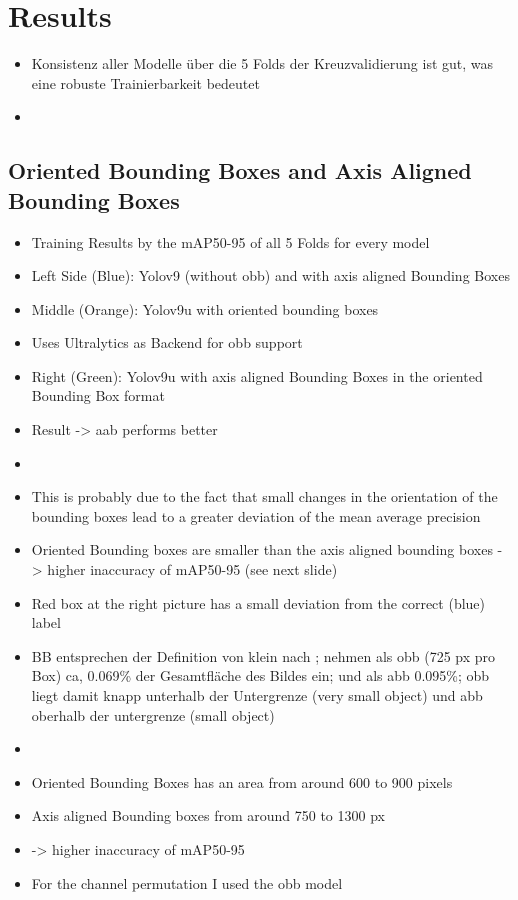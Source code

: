 \chapter{Results}
\label{ch:results}


\begin{itemize}
    \item Konsistenz aller Modelle über die 5 Folds der Kreuzvalidierung ist gut, was eine robuste Trainierbarkeit bedeutet
    \item {}
\end{itemize}
\section{Oriented Bounding Boxes and Axis Aligned Bounding Boxes}
\begin{itemize}
    \item Training Results by the mAP50-95 of all 5 Folds for every model 
    \item Left Side (Blue): Yolov9 (without obb) and with axis aligned Bounding Boxes
    \item Middle (Orange): Yolov9u with oriented bounding boxes
    \item Uses Ultralytics as Backend for obb support
    \item Right (Green): Yolov9u with axis aligned Bounding Boxes in the oriented Bounding Box format
    \item Result -> aab performs better
    \item {}
    \item This is probably due to the fact that small changes in the orientation of the bounding boxes lead to a greater deviation of the mean average precision 
    \item Oriented Bounding boxes are smaller than the axis aligned bounding boxes -> higher inaccuracy of mAP50-95 (see next slide)
    \item Red box at the right picture has a small deviation from the correct (blue) label
    \item BB entsprechen der Definition von klein nach \cite{Chen2017}; nehmen als obb (725 px pro Box) ca, 0.069\% der Gesamtfläche des Bildes ein; und als abb 0.095\%; obb liegt damit knapp unterhalb der Untergrenze (very small object) und abb oberhalb der untergrenze (small object)
\end{itemize}
\begin{itemize}
    \item {}
    \item Oriented Bounding Boxes has an area from around 600 to 900 pixels 
    \item Axis aligned Bounding boxes from around 750 to 1300 px
    \item-> higher inaccuracy of mAP50-95

    \item For the channel permutation I used the obb model

\end{itemize}

